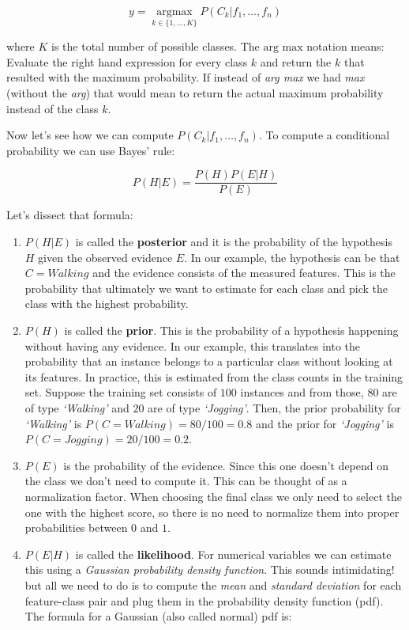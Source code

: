 \documentclass[
  11pt,
]{krantz}
\begin{document}
\begin{equation}
  y = \operatorname*{arg max}_{k \in \{1, \dots ,K\}} P(C_k | f_1,\dots ,f_n)
  \label{eq:bayesclassifier}
\end{equation}

where \(K\) is the total number of possible classes. The \(\text{arg max}\) notation means: Evaluate the right hand expression for every class \(k\) and return the \(k\) that resulted with the maximum probability. If instead of \emph{arg max} we had \emph{max} (without the \emph{arg}) that would mean to return the actual maximum probability instead of the class \(k\).

Now let's see how we can compute \(P(C_k | f_1,\dots ,f_n)\). To compute a conditional probability we can use Bayes' rule:

\begin{equation}
  P(H|E) = \frac{P(H)P(E|H)}{P(E)}
  \label{eq:bayesrule}
\end{equation}

Let's dissect that formula:

\begin{enumerate}
\def\labelenumi{\arabic{enumi}.}
\item
  \(P(H|E)\) is called the \textbf{posterior} and it is the probability of the hypothesis \(H\) given the observed evidence \(E\). In our example, the hypothesis can be that \(C=Walking\) and the evidence consists of the measured features. This is the probability that ultimately we want to estimate for each class and pick the class with the highest probability.
\item
  \(P(H)\) is called the \textbf{prior}. This is the probability of a hypothesis happening without having any evidence. In our example, this translates into the probability that an instance belongs to a particular class without looking at its features. In practice, this is estimated from the class counts in the training set. Suppose the training set consists of \(100\) instances and from those, \(80\) are of type \emph{`Walking'} and \(20\) are of type \emph{`Jogging'}. Then, the prior probability for \emph{`Walking'} is \(P(C=Walking)=80/100=0.8\) and the prior for \emph{`Jogging'} is \(P(C=Jogging)=20/100=0.2\).
\item
  \(P(E)\) is the probability of the evidence. Since this one doesn't depend on the class we don't need to compute it. This can be thought of as a normalization factor. When choosing the final class we only need to select the one with the highest score, so there is no need to normalize them into proper probabilities between \(0\) and \(1\).
\item
  \(P(E|H)\) is called the \textbf{likelihood}. For numerical variables we can estimate this using a \emph{Gaussian probability density function}. This sounds intimidating! but all we need to do is to compute the \emph{mean} and \emph{standard deviation} for each feature-class pair and plug them in the probability density function (pdf). The formula for a Gaussian (also called normal) pdf is:
\end{enumerate}
\end{document}
